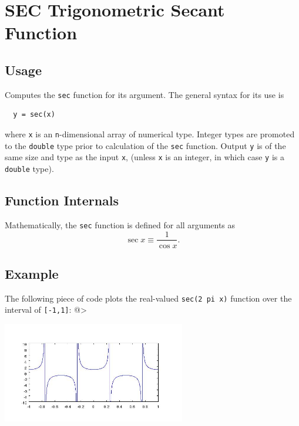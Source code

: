 \section{SEC Trigonometric Secant Function}

\subsection{Usage}

Computes the \verb|sec| function for its argument.  The general
syntax for its use is
\begin{verbatim}
  y = sec(x)
\end{verbatim}
where \verb|x| is an \verb|n|-dimensional array of numerical type.
Integer types are promoted to the \verb|double| type prior to
calculation of the \verb|sec| function.  Output \verb|y| is of the
same size and type as the input \verb|x|, (unless \verb|x| is an
integer, in which case \verb|y| is a \verb|double| type).  
\subsection{Function Internals}

Mathematically, the \verb|sec| function is defined for all arguments
as
\[
   \sec x \equiv \frac{1}{\cos x}.
\]
\subsection{Example}

The following piece of code plots the real-valued \verb|sec(2 pi x)|
function over the interval of \verb|[-1,1]|:
@>


\centerline{\includegraphics[width=8cm]{secplot}}

